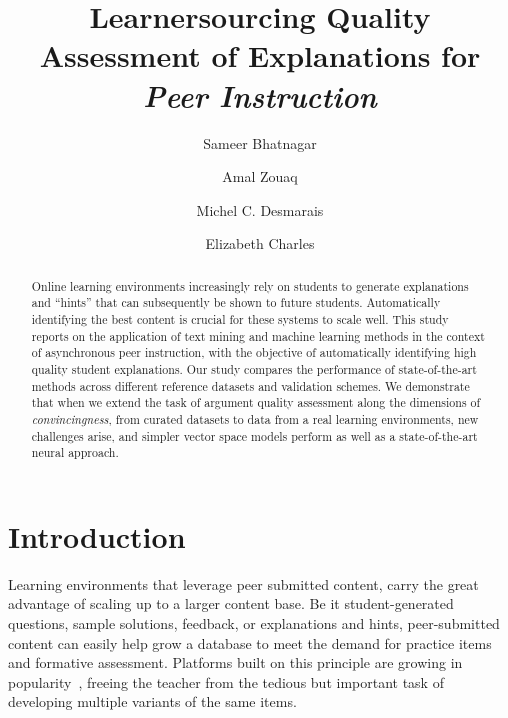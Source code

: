 \documentclass[runningheads]{llncs}
\begin{document}
%
\title{Learnersourcing Quality Assessment of Explanations for \textit{Peer 
Instruction}}
%
\author{Sameer Bhatnagar \and
Amal Zouaq \and
Michel C. Desmarais \and
Elizabeth Charles
}
%

%
\maketitle              %
%
\begin{abstract}
Online learning environments increasingly rely on students to generate 
explanations and ``hints'' that can subsequently be shown to future students. 
Automatically identifying the best content is crucial for these systems to 
scale well. 
This study reports on the application of text mining and machine learning 
methods in the context of asynchronous peer instruction, with the objective of 
automatically identifying high quality student explanations. 
Our study compares the performance of state-of-the-art methods across different 
reference datasets and validation schemes.
We demonstrate that when we extend the task of argument quality assessment 
along the dimensions of \textit{convincingness}, from curated datasets to data 
from a real learning environments, new challenges arise, and simpler vector 
space models perform as well as a state-of-the-art neural approach. 

\end{abstract}

\section{Introduction}

Learning environments that leverage peer submitted content, carry the great 
advantage of scaling up to a larger content base.  
Be it student-generated questions, sample solutions, feedback, or explanations 
and hints, peer-submitted content can easily help grow a database to meet the 
demand for practice items and formative assessment.
Platforms built on this principle are growing in 
popularity~\cite{denny_effect_2013}\cite{khosravi_ripple_2019}, freeing the 
teacher from the tedious but important task of developing multiple variants of 
the same 
items. 
\end{document}
